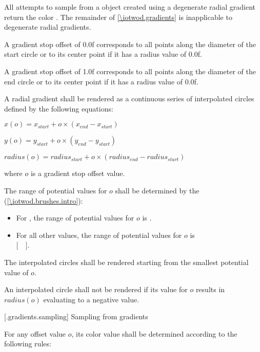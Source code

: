 \pnum
All attempts to sample from a  object created using a degenerate radial gradient return the color . The remainder of \ref{\iotwod.gradients} is inapplicable to degenerate radial gradients.

\pnum
A gradient stop offset of 0.0f corresponds to all points along the diameter of the start circle or to its center point if it has a radius value of 0.0f.

\pnum
A gradient stop offset of 1.0f corresponds to all points along the diameter of the end circle or to its center point if it has a radius value of 0.0f.

\pnum
A radial gradient shall be rendered as a continuous series of interpolated circles defined by the following equations:
\begin{enumeratea}
\item $x(o) = x_{start} + o \times (x_{end} - x_{start})$
\item $y(o) = y_{start} + o \times (y_{end} - y_{start})$
\item $radius(o) = radius_{start} + o \times (radius_{end} - radius_{start})$
\end{enumeratea}
where $o$ is a gradient stop offset value.

\pnum
The range of potential values for $o$ shall be determined by the  (\ref{\iotwod.brushes.intro}):
\begin{itemize}
\item For , the range of potential values for $o$ is .
\item For all other  values, the range of potential values for $o$ is\\ $[$~~$]$.
\end{itemize}

\pnum
The interpolated circles shall be rendered starting from the smallest potential value of $o$.

\pnum
An interpolated circle shall not be rendered if its value for $o$ results in $radius(o)$ evaluating to a negative value.

 [\iotwod.gradients.sampling] {Sampling from gradients}

\pnum
For any offset value $o$, its color value shall be determined according to the following rules:


